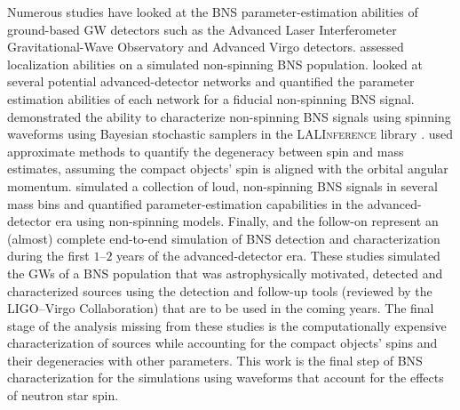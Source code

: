 Numerous studies have looked at the BNS parameter-estimation abilities of ground-based GW detectors such as the Advanced Laser Interferometer Gravitational-Wave Observatory \citep[aLIGO;][]{Aasi_2015} and Advanced Virgo \citep[AdV;][]{Acernese_2014} detectors. \citet{Nissanke_2010,Nissanke_2011} assessed localization abilities on a simulated non-spinning BNS population. \citet{Veitch_2012} looked at several potential advanced-detector networks and quantified the parameter estimation abilities of each network for a fiducial non-spinning BNS signal. \citet{Aasi_2013} demonstrated the ability to characterize non-spinning BNS signals using spinning waveforms using Bayesian stochastic samplers in the \textsc{LALInference} library \citep{Veitch_2014}.  \citet{Hannam_2013} used approximate methods to quantify the degeneracy between spin and mass estimates, assuming the compact objects' spin is aligned with the orbital angular momentum. \citet{Rodriguez_2014} simulated a collection of loud, non-spinning BNS signals in several mass bins and quantified parameter-estimation capabilities in the advanced-detector era using non-spinning models.  Finally, \citet{Singer_2014} and the follow-on \citet{Berry_2014} represent an (almost) complete end-to-end simulation of BNS detection and characterization during the first $1$--$2$ years of the advanced-detector era. These studies simulated the GWs of a BNS population that was astrophysically motivated, detected and characterized sources using the detection and follow-up tools (reviewed by the LIGO--Virgo Collaboration) that are to be used in the coming years.   The final stage of the analysis missing from these studies is the computationally expensive characterization of sources while accounting for the compact objects' spins and their degeneracies with other parameters.  This work is the final step of BNS characterization for the \citet{Singer_2014} simulations using waveforms that account for the effects of neutron star spin.